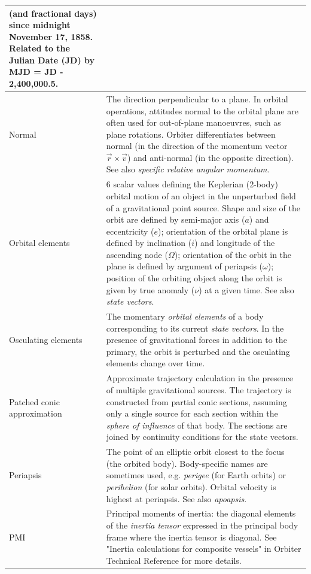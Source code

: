 \documentclass[Orbiter User Manual.tex]{subfiles}
\begin{document}
\begin{longtable}{ >{\RaggedRight}p{} p{} }
		(and fractional days) since midnight November 17, 1858. Related to the
		Julian Date (JD) by MJD = JD - 2,400,000.5.\\
	\hline
	Normal & The direction perpendicular to a plane. In orbital operations,
		attitudes normal to the orbital plane are often used for out-of-plane
		manoeuvres, such as plane rotations. Orbiter differentiates between
		normal (in the direction of the momentum vector
		$\vec{r} \times \vec{v}$) and anti-normal (in the opposite direction).
		See also \emph{specific relative angular momentum}.\\
	\hline
	Orbital elements & 6 scalar values defining the Keplerian (2-body) orbital
		motion of an object in the unperturbed field of a gravitational point
		source. Shape and size of the orbit are defined by semi-major axis ($a$)
		and eccentricity ($e$); orientation of the orbital plane is defined by
		inclination ($i$) and longitude of the ascending node ($\Omega$);
		orientation of the orbit in the plane is defined by argument of
		periapsis ($\omega$); position of the orbiting object along the orbit is
		given by true anomaly ($\nu$) at a given time. See also \emph{state
		vectors}.\\
	\hline
	Osculating elements & The momentary \emph{orbital elements} of a body
		corresponding to its current \emph{state vectors}. In the presence of
		gravitational forces in addition to the primary, the orbit is perturbed
		and the osculating elements change over time.\\
	\hline
	Patched conic approximation & Approximate trajectory calculation in the
		presence of multiple gravitational sources. The trajectory is
		constructed from partial conic sections, assuming only a single source
		for each section within the \textit{sphere of influence} of that body.
		The sections are joined by continuity conditions for the state
		vectors.\\
	\hline
	Periapsis & The point of an elliptic orbit closest to the focus (the orbited
		body). Body-specific names are sometimes used, e.g. \emph{perigee} (for
		Earth orbits) or \emph{perihelion} (for solar orbits). Orbital velocity
		is highest at periapsis. See also \emph{apoapsis}.\\
	\hline
	PMI & Principal moments of inertia: the diagonal elements of the
		\emph{inertia tensor} expressed in the principal body frame where the
		inertia tensor is diagonal. See "Inertia calculations for composite
		vessels" in Orbiter Technical Reference for more details.\\

\end{longtable}
\end{document}
